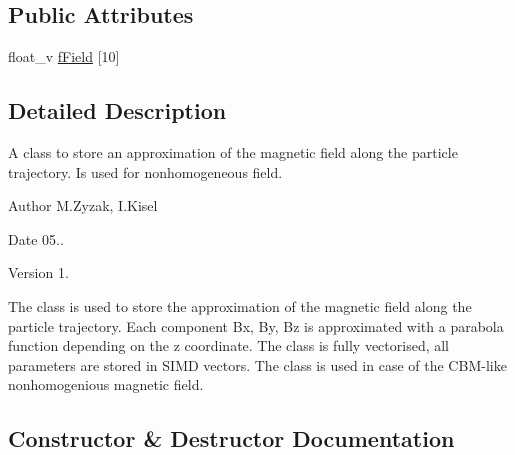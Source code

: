 \subsection*{Public Attributes}
\begin{DoxyCompactItemize}
\item 
float\+\_\+v \hyperlink{classKFParticleFieldRegion_a712bf96984646afa020612aefd28bc21}{f\+Field} \mbox{[}10\mbox{]}
\end{DoxyCompactItemize}


\subsection{Detailed Description}
A class to store an approximation of the magnetic field along the particle trajectory. Is used for nonhomogeneous field. 

\begin{DoxyAuthor}{Author}
M.\+Zyzak, I.\+Kisel 
\end{DoxyAuthor}
\begin{DoxyDate}{Date}
05.. 
\end{DoxyDate}
\begin{DoxyVersion}{Version}
1.
\end{DoxyVersion}
The class is used to store the approximation of the magnetic field along the particle trajectory. Each component Bx, By, Bz is approximated with a parabola function depending on the z coordinate. The class is fully vectorised, all parameters are stored in S\+I\+MD vectors. The class is used in case of the C\+B\+M-\/like nonhomogenious magnetic field. 

\subsection{Constructor \& Destructor Documentation}
